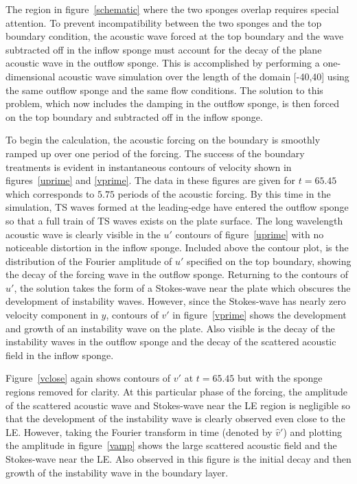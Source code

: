 The region in figure~\ref{schematic} where the two sponges overlap requires
special attention.  To prevent incompatibility between the two sponges and the
top boundary condition, the acoustic wave forced at the top boundary and the
wave subtracted off in the inflow sponge must account for the decay of the
plane acoustic wave in the outflow sponge.  This is accomplished by performing
a one-dimensional acoustic wave simulation over the length of the domain
[-40,40] using the same outflow sponge and the same flow conditions.  The
solution to this problem, which now includes the damping in the outflow
sponge, is then forced on the top boundary and subtracted off in the inflow
sponge.

To begin the calculation, the acoustic forcing on the boundary is smoothly
ramped up over one period of the forcing.  The success of the boundary
treatments is evident in instantaneous contours of velocity shown in
figures~\ref{uprime} and \ref{vprime}.  The data in these figures are given
for $t=65.45$ which corresponds to $5.75$ periods of the acoustic forcing.  By
this time in the simulation, TS waves formed at the leading-edge have entered
the outflow sponge so that a full train of TS waves exists on the plate
surface.  The long wavelength acoustic wave is clearly visible in the $u'$
contours of figure~\ref{uprime} with no noticeable distortion in the inflow
sponge.  Included above the contour plot, is the distribution of the Fourier
amplitude of $u'$ specified on the top boundary, showing the decay of the
forcing wave in the outflow sponge.  Returning to the contours of $u'$, the
solution takes the form of a Stokes-wave near the plate which obscures the
development of instability waves.  However, since the Stokes-wave has nearly
zero velocity component in $y$, contours of $v'$ in figure~\ref{vprime} shows
the development and growth of an instability wave on the plate.  Also visible
is the decay of the instability waves in the outflow sponge and the decay of
the scattered acoustic field in the inflow sponge.

Figure~\ref{vclose} again shows contours of $v'$ at $t=65.45$ but with the
sponge regions removed for clarity.  At this particular phase of the forcing,
the amplitude of the scattered acoustic wave and Stokes-wave near the LE
region is negligible so that the development of the instability wave is
clearly observed even close to the LE.  However, taking the Fourier transform
in time (denoted by $\hat v'$) and plotting the amplitude in figure~\ref{vamp}
shows the large scattered acoustic field and the Stokes-wave near the LE.
Also observed in this figure is the initial decay and then growth of the
instability wave in the boundary layer.

